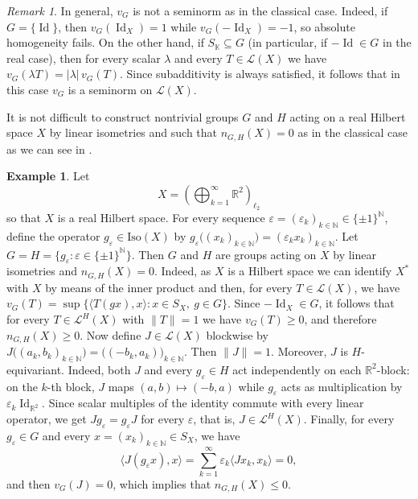 \documentclass[a4paper,12pt]{amsart}
\theoremstyle{definition}
\theoremstyle{definition}
\newtheorem{example}[theorem]{Example}
\theoremstyle{remark}
\newtheorem{remark}[theorem]{Remark}
\numberwithin{equation}{section}
\newcommand{\R}{\mathbb{R}}
\newcommand{\N}{\mathbb{N}}
\newcommand{\K}{\mathbb{K}}
\newcommand{\Iso}{\mathrm{Iso}}
\DeclareMathOperator{\id}{Id}
\renewcommand{\geq}{\geqslant}
\renewcommand{\leq}{\leqslant}
\newcommand{\<}{\langle}
\renewcommand{\>}{\rangle}
\newcommand{\e}{\varepsilon}
\begin{document}
	\begin{remark}
		In general, $v_G$ is not a seminorm as in the classical case. Indeed, if $G=\{\id\}$, then $v_G(\id_X)=1$ while $v_G(-\id_X)=-1$, so absolute homogeneity fails. On the other hand, if $S_{\K}\subseteq G$ (in particular, if $-\id\in G$ in the real case), then for every scalar $\lambda$ and every $T\in\mathcal{L}(X)$ we have $v_G(\lambda T)=|\lambda|\,v_G(T)$. Since subadditivity is always satisfied, it follows that in this case $v_G$ is a seminorm on $\mathcal{L}(X)$.
	\end{remark}
	
	
	It is not difficult to construct nontrivial groups $G$ and $H$ acting on a real Hilbert space $X$ by linear isometries and such that $n_{G,H}(X) = 0$ as in the classical case as we can see in .
	
	\begin{example} \label{example:G-numerical-index-equals-0}
		Let
		\begin{equation*}
			X = \left( \bigoplus_{k=1}^{\infty} \mathbb{R}^2 \right)_{\ell_2} 
		\end{equation*}
		so that $X$ is a real Hilbert space. For every sequence $\e = (\e_k)_{k \in \N} \in \{\pm 1\}^{\N}$, define the operator $g_\e \in \Iso(X)$ by $g_\e \big( (x_k)_{k \in \N} \big) = (\e_k x_k)_{k \in \N}$. Let $G = H = \{g_\e : \e \in \{\pm 1\}^{\N}\}$. Then $G$ and $H$ are groups acting on $X$ by linear isometries and $n_{G,H}(X)=0$. Indeed, as $X$ is a Hilbert space we can identify $X^*$ with $X$ by means of the inner product and then, for every $T \in \mathcal{L}(X)$, we have $v_G(T) = \sup \big\{ \langle T(gx), x \rangle : x \in S_X,\ g \in G \big\}$. Since $-\id_X \in G$, it follows that for every $T \in \mathcal{L}^H(X)$ with $\|T\|=1$ we have $v_G(T)\geq 0$, and therefore $n_{G,H}(X)\geq 0$. Now define $J \in \mathcal{L}(X)$ blockwise by $J\big( (a_k,b_k)_{k \in \N} \big) = \big( (-b_k,a_k) \big)_{k \in \N}$. Then $\|J\|=1$. Moreover, $J$ is $H$-equivariant. Indeed, both $J$ and every $g_\e \in H$ act independently on each $\R^2$-block: on the $k$-th block, $J$ maps $(a,b)\mapsto(-b,a)$ while $g_\e$ acts as multiplication by $\e_k \id_{\mathbb{R}^2}$. Since scalar multiples of the identity commute with every linear operator, we get $J g_\e = g_\e J$ for every $\e$, that is, $J \in \mathcal{L}^H(X)$. Finally, for every $g_\e \in G$ and every $x=(x_k)_{k \in \N} \in S_X$, we have
		\begin{equation*}
			\langle J(g_\e x), x \rangle
			= \sum_{k=1}^{\infty} \e_k \langle Jx_k, x_k \rangle
			= 0,
		\end{equation*}
		and then $v_G(J)=0$, which implies that $n_{G,H}(X)\leq 0$.
	\end{example}
	
\end{document}
